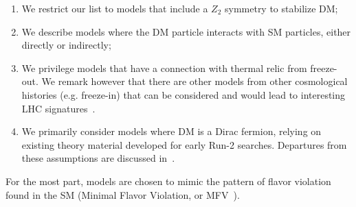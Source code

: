 \begin{enumerate}
\item We restrict our list to models that include a $Z_2$ symmetry to stabilize DM;
\item We describe models where the DM particle interacts with SM particles, either directly or indirectly;
\item We privilege models that have a connection with thermal relic from freeze-out. We remark however that there are other models from other cosmological histories (e.g. freeze-in) that can be considered and would lead to interesting LHC signatures~\cite{Bernal:2017kxu}. 
\item We primarily consider models where DM is a Dirac fermion, relying on existing theory material developed for early Run-2 searches. Departures from these assumptions are discussed in~\cite{Abercrombie:2015wmb}. 
\end{enumerate}

For the most part, models are chosen to mimic the pattern of flavor violation found in the SM (Minimal Flavor Violation, or MFV~\cite{DAmbrosio:2002vsn}). 


